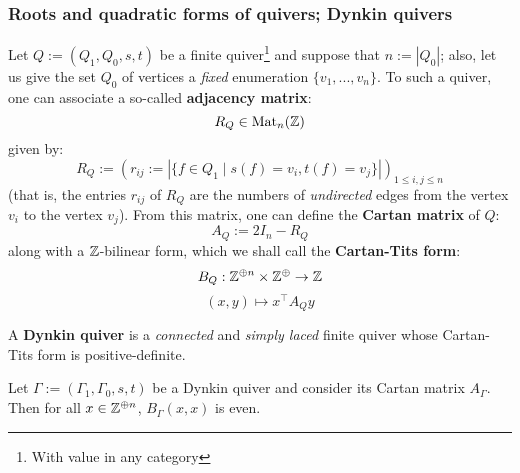         \subsubsection{Roots and quadratic forms of quivers; Dynkin quivers}
            \begin{definition} \label{def: adjacency_and_cartan_matrices}
                Let $Q := (Q_1, Q_0, s, t)$ be a finite quiver\footnote{With value in any category} and suppose that $n := |Q_0|$; also, let us give the set $Q_0$ of vertices a \textit{fixed} enumeration $\{v_1, ..., v_n\}$. To such a quiver, one can associate a so-called \textbf{adjacency matrix}:
                    $$R_Q \in \mathrm{Mat}_n(\mathbb{Z})$$
                given by:
                    $$R_Q := (r_{ij} := |\{f \in Q_1 \mid s(f) = v_i, t(f) = v_j\}|)_{1 \leq i, j \leq n}$$
                (that is, the entries $r_{ij}$ of $R_Q$ are the numbers of \textit{undirected} edges from the vertex $v_i$ to the vertex $v_j$). From this matrix, one can define the \textbf{Cartan matrix} of $Q$:
                    $$A_Q := 2I_n - R_Q$$
                along with a $\mathbb{Z}$-bilinear form, which we shall call the \textbf{Cartan-Tits form}:
                    $$B_Q: \Z^{\oplus n} \x \Z^{\oplus} \to \Z$$
                    $$(x, y) \mapsto x^{\top} A_Q y$$                
            \end{definition}
            \begin{definition} \label{def: dynkin_quivers}
                A \textbf{Dynkin quiver} is a \textit{connected} and \textit{simply laced} finite quiver whose Cartan-Tits form is positive-definite.
            \end{definition}
            \begin{proposition}
                Let $\Gamma := (\Gamma_1, \Gamma_0, s, t)$ be a Dynkin quiver and consider its Cartan matrix $A_{\Gamma}$. Then for all $x \in \mathbb{Z}^{\oplus n}$, $B_{\Gamma}(x, x)$ is even.  
            \end{proposition}
